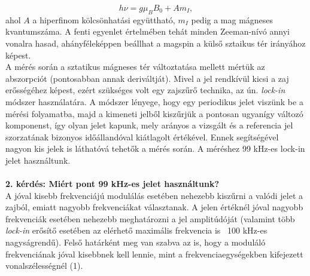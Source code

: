 \documentclass[12pt,a4paper]{article}
\begin{document}
\begin{equation}
h\nu=g\mu_{B}B_0+Am_{I},
\end{equation}
ahol $A$ a hiperfinom kölcsönhatási együttható, $m_{I}$ pedig a mag mágneses kvantumszáma. A fenti egyenlet értelmében tehát minden Zeeman-nívó annyi vonalra hasad, ahányféleképpen beállhat a magspin a külső sztaikus tér irányához képest.\\
\hspace*{10pt} A mérés során a sztatikus mágneses tér változtatása mellett mértük az abszorpciót (pontosabban annak deriváltját). Mivel a jel rendkívül kicsi a zaj erősségéhez képest, ezért szükséges volt egy zajszűrő technika, az ún. \emph{lock-in} módszer használatára. A módszer lényege, hogy egy periodikus jelet viszünk be a mérési folyamatba, majd a kimeneti jelből kiszűrjük a pontosan ugyanígy változó komponenst, így olyan jelet kapunk, mely arányos a vizsgált és a referencia jel szorzatának bizonyos időállandóval kiátlagolt értékével. Ennek segítségével nagyon kis jelek is láthatóvá tehetők a mérés során. A méréshez 99 kHz-es lock-in jelet használtunk.\\
\\
\textbf{2. kérdés: Miért pont 99 kHz-es jelet használtunk?}\\
A jóval kisebb frekvenciájú modulálás esetében nehezebb kiszűrni a valódi jelet a zajból, emiatt nagyobb frekvenciákat választanak. A jelen értéknél jóval nagyobb frekvenciák esetében nehezebb meghatározni a jel amplitúdóját (valamint több \emph{lock-in} erősítő esetében az elérhető maximális frekvencia is ~100 kHz-es nagyságrendű). Felső határként meg van szabva az is, hogy a moduláló frekvenciának jóval kisebbnek kell lennie, mint a frekvenciaegységekben kifejezett vonalszélességnél (1).
\end{document}
